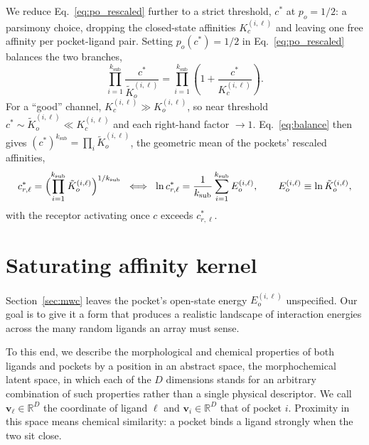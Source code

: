 \documentclass[aps,pre,superscriptaddress,floatfix,longbibliography,linenumbers]{revtex4-2}
\begin{document}
We reduce Eq.~\eqref{eq:po_rescaled} further to a strict threshold, $c^*$ at
$p_o=1/2$: a parsimony choice, dropping the closed-state affinities
$K_c^{(i,\ell)}$ and leaving one free affinity per pocket-ligand pair.
Setting $p_o(c^*)=1/2$ in Eq.~\eqref{eq:po_rescaled} balances the two
branches,
\begin{equation}
\prod_{i=1}^{k_\text{sub}} \frac{c^*}{\tilde K_o^{(i,\ell)}} = \prod_{i=1}^{k_\text{sub}} \left(1+\frac{c^*}{K_c^{(i,\ell)}}\right).
\label{eq:balance}
\end{equation}
For a ``good'' channel, $K_c^{(i,\ell)}\gg K_o^{(i,\ell)}$, so near
threshold $c^*\sim\tilde K_o^{(i,\ell)}\ll K_c^{(i,\ell)}$ and each
right-hand factor $\to1$. Eq.~\eqref{eq:balance} then gives
$(c^*)^{k_\text{sub}}=\prod_i\tilde K_o^{(i,\ell)}$, the geometric mean of
the pockets' rescaled affinities,
\begin{equation}
c^*_{r,\ell} = \Bigl(\prod_{i=1}^{k_\text{sub}} \tilde K_o^{(i,\ell)}\Bigr)^{1/k_\text{sub}}
\;\;\Longleftrightarrow\;\;
\ln c^*_{r,\ell} = \frac{1}{k_\text{sub}}\sum_{i=1}^{k_\text{sub}} E_o^{(i,\ell)},
\qquad E_o^{(i,\ell)} \equiv \ln\tilde K_o^{(i,\ell)},
\label{eq:ec50}
\end{equation}
with the receptor activating once $c$ exceeds $c^*_{r,\ell}$.

\section{Saturating affinity kernel}
\label{sec:kernel}

Section~\ref{sec:mwc} leaves the pocket's open-state energy
$E_o^{(i,\ell)}$ unspecified. Our goal is to give it a form that produces a
realistic landscape of interaction energies across the many random ligands
an array must sense.

To this end, we describe the morphological and chemical properties of both
ligands and pockets by a position in an abstract space, the morphochemical
latent space, in which each of the $D$ dimensions stands for an arbitrary
combination of such properties rather than a single physical descriptor. We
call $\mathbf v_\ell\in\mathbb R^D$ the coordinate of ligand $\ell$ and
$\mathbf v_i\in\mathbb R^D$ that of pocket $i$. Proximity in this space
means chemical similarity: a pocket binds a ligand strongly when the two
sit close.
\end{document}
